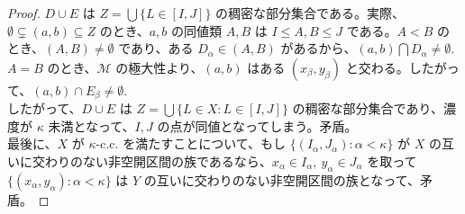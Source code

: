 \documentclass{jsarticle}
\theoremstyle{definition}
\begin{document}
\begin{proof}
        $D\cup E$ は $Z = \bigcup \{L \in [I, J]\}$ の稠密な部分集合である。実際、$\emptyset \subsetneq (a, b) \subseteq Z$ のとき、$a, b$ の同値類 $A, B$ は $I \leq A, B \leq J$ である。$A < B$ のとき、$(A, B) \neq \emptyset$ であり、ある $D_\alpha \in (A, B)$ があるから、$(a, b) \bigcap D_\alpha \neq \emptyset.$\\
        $A = B$ のとき、$\mathcal{M}$ の極大性より、$(a, b)$ はある $(x_\beta, y_\beta)$ と交わる。したがって、$(a, b) \cap E_\beta \neq \emptyset.$\\
        したがって、$D\cup E$ は $Z = \bigcup \{L \in X : L \in [I, J]\}$ の稠密な部分集合であり、濃度が $\kappa$ 未満となって、$I, J$ の点が同値となってしまう。矛盾。\\
        最後に、$X$ が $\kappa$-c.c. を満たすことについて、もし $\{(I_\alpha, J_\alpha) : \alpha < \kappa\}$ が $X$ の互いに交わりのない非空開区間の族であるなら、$x_\alpha \in I_\alpha, \ y_\alpha \in J_\alpha$ を取って $\{(x_\alpha, y_\alpha) : \alpha < \kappa\}$ は $Y$ の互いに交わりのない非空開区間の族となって、矛盾。
    \end{proof}
    
\end{document}
